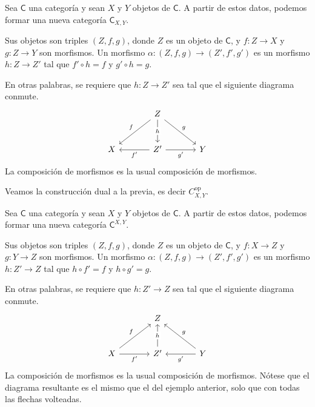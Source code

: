 \documentclass[../main.tex]{subfiles}
\begin{document}
\begin{exampleap}\label{prodcat}
    Sea $\mathsf{C}$ una categor\'ia y sean $X$ y $Y$ objetos de $\mathsf{C}$.
    A partir de estos datos, podemos formar una nueva categor\'ia $\mathsf{C}_{X,Y}$.

    Sus objetos son triples $(Z,f,g)$, donde $Z$ es un objeto de $\mathsf{C}$, y $f:Z \to X$ y $g:Z \to Y$ son morfismos.
    Un morfismo $\alpha: (Z, f , g) \to (Z', f',g')$ es un morfismo $h: Z \to Z'$ tal que $f' \circ h = f$ y $g' \circ h = g$.

    En otras palabras, se requiere que $h:Z \to Z'$ sea tal que el siguiente diagrama conmute.
    \[\begin{tikzcd}[row sep=large,column sep=large]
            & Z \\
            X & {Z'} & Y
            \arrow["f"', from=1-2, to=2-1]
            \arrow["{f'}", from=2-2, to=2-1]
            \arrow["g", from=1-2, to=2-3]
            \arrow["{g'}"', from=2-2, to=2-3]
            \arrow["h"{description}, from=1-2, to=2-2]
        \end{tikzcd}\]
    La composici\'on de morfismos es la usual composici\'on de morfismos.
\end{exampleap}

\begin{exampleap}\label{coprodcat}
    Veamos la construcci\'on dual a la previa, es decir $C^{\text{op}}_{X,Y}$.

    Sea $\mathsf{C}$ una categor\'ia y sean $X$ y $Y$ objetos de $\mathsf{C}$.
    A partir de estos datos, podemos formar una nueva categor\'ia $\mathsf{C}^{X,Y}$.

    Sus objetos son triples $(Z,f,g)$, donde $Z$ es un objeto de $\mathsf{C}$, y $f:X \to Z$ y $g:Y \to Z$ son morfismos.
    Un morfismo $\alpha: (Z, f , g) \to (Z', f', g')$ es un morfismo $h: Z' \to Z$ tal que $h \circ f' = f$ y $h \circ g' = g$.

    En otras palabras, se requiere que $h:Z' \to Z$ sea tal que el siguiente diagrama conmute.
    \[\begin{tikzcd}[row sep=large,column sep=large]
            & Z \\
            X & {Z'} & Y
            \arrow["f", from=2-1, to=1-2]
            \arrow["{f'}"', from=2-1, to=2-2]
            \arrow["g"', from=2-3, to=1-2]
            \arrow["{g'}", from=2-3, to=2-2]
            \arrow["h"{description}, from=2-2, to=1-2]
        \end{tikzcd}\]
    La composici\'on de morfismos es la usual composici\'on de morfismos. N\'otese que el diagrama resultante es el mismo que el del ejemplo anterior, solo que con todas las flechas volteadas.
\end{exampleap}
\end{document}
